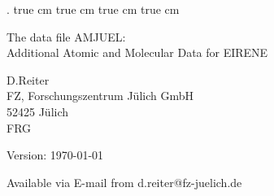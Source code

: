 . true cm
 true cm
 true cm
 true cm

\parindent 0pt
{\LARGE \bf \center
\vspace*{3truecm}

The data file AMJUEL: \\
Additional Atomic and Molecular Data for EIRENE
\vspace*{3truecm}

D.Reiter \\
FZ, Forschungszentrum J\"ulich GmbH \\
52425 J\"ulich \\
FRG
\vspace{5truecm}

Version: \today
\vspace{3truecm}

Available via E-mail from d.reiter@fz-juelich.de
}
\tableofcontents
\newpage

